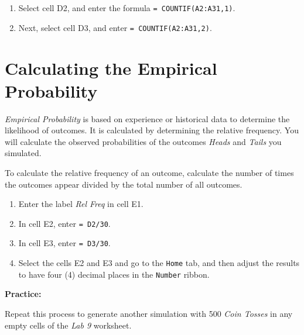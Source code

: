 \documentclass[
]{book}
\providecommand{\tightlist}{%
  \setlength{\itemsep}{0pt}\setlength{\parskip}{0pt}}
\begin{document}
\begin{enumerate}
\def\labelenumi{\arabic{enumi}.}
\tightlist
\item
  Select cell D2, and enter the formula \texttt{=\ COUNTIF(A2:A31,1)}.
\item
  Next, select cell D3, and enter \texttt{=\ COUNTIF(A2:A31,2)}.
\end{enumerate}

\hypertarget{calculating-the-empirical-probability}{%
\section{Calculating the Empirical Probability}\label{calculating-the-empirical-probability}}

\emph{Empirical Probability} is based on experience or historical data to determine the likelihood of outcomes. It is calculated by determining the relative frequency. You will calculate the observed probabilities of the outcomes \emph{Heads} and \emph{Tails} you simulated.

To calculate the relative frequency of an outcome, calculate the number of times the outcomes appear divided by the total number of all outcomes.

\begin{enumerate}
\def\labelenumi{\arabic{enumi}.}
\tightlist
\item
  Enter the label \emph{Rel Freq} in cell E1.
\item
  In cell E2, enter \texttt{=\ D2/30}.
\item
  In cell E3, enter \texttt{=\ D3/30}.
\item
  Select the cells E2 and E3 and go to the \texttt{Home} tab, and then adjust the results to have four (4) decimal places in the \texttt{Number} ribbon.
\end{enumerate}

\textbf{Practice:}

Repeat this process to generate another simulation with 500 \emph{Coin Tosses} in any empty cells of the \emph{Lab 9} worksheet.

  
\end{document}

